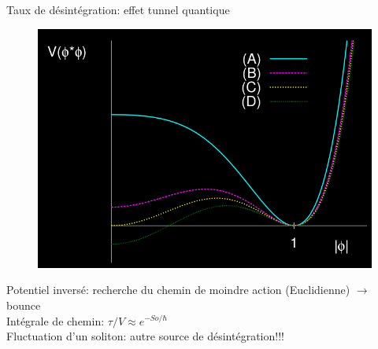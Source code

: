 \documentclass[handout]{beamer}
\begin{document}
\begin{frame}
Taux de désintégration: effet tunnel quantique
\begin{figure}[0.5\textwidth]
   \includegraphics[scale=0.25]{evo_pot.png}
 \end{figure}
Potentiel inversé: recherche du chemin de moindre action (Euclidienne) $\rightarrow$ bounce \\
Intégrale de chemin: $ \tau/V \approx e^{-So/\hbar}$ \\
Fluctuation d'un soliton: autre source de désintégration!!!\\
\end{frame}




\end{document}
